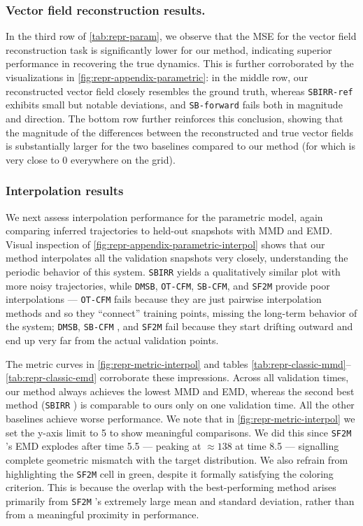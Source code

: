\subsubsection{Vector field reconstruction results.}
\label{app:repr-vector-parametric}

In the third row of \cref{tab:repr-param}, we observe that the MSE for the vector field reconstruction task is significantly lower for our method, indicating superior performance in recovering the true dynamics. This is further corroborated by the visualizations in \cref{fig:repr-appendix-parametric}: in the middle row, our reconstructed vector field closely resembles the ground truth, whereas \texttt{SBIRR-ref} exhibits small but notable deviations, and \texttt{SB-forward} fails both in magnitude and direction. The bottom row further reinforces this conclusion, showing that the magnitude of the differences between the reconstructed and true vector fields is substantially larger for the two baselines compared to our method (for which is very close to 0 everywhere on the grid).

\subsubsection{Interpolation results}
\label{app:repr-interpol-parametric}

We next assess interpolation performance for the parametric model, again comparing inferred trajectories to held-out snapshots with MMD and EMD. Visual inspection of \cref{fig:repr-appendix-parametric-interpol} shows that our method interpolates all the validation snapshots very closely, understanding the periodic behavior of this system. \texttt{SBIRR} yields a qualitatively similar plot with more noisy trajectories, while \texttt{DMSB}, \texttt{OT-CFM}, \texttt{SB-CFM}, and \texttt{SF2M} provide poor interpolations --- \texttt{OT-CFM} fails because they are just pairwise interpolation methods and so they “connect” training points, missing the long-term behavior of the system; \texttt{DMSB}, \texttt{SB-CFM} , and \texttt{SF2M} fail because they start drifting outward and end up very far from the actual validation points.  

The metric curves in \cref{fig:repr-metric-interpol} and tables \cref{tab:repr-classic-mmd}–\cref{tab:repr-classic-emd} corroborate these impressions. Across all validation times, our method always achieves the lowest MMD and EMD, whereas the second best method (\texttt{SBIRR} ) is comparable to ours only on one validation time. All the other baselines achieve worse performance. We note that in  \cref{fig:repr-metric-interpol} we set the y-axis limit to 5 to show meaningful comparisons. We did this since \texttt{SF2M} ’s EMD explodes after time 5.5 --- peaking at $\approx 138$ at time 8.5 --- signalling complete geometric mismatch with the target distribution. We also refrain from highlighting the \texttt{SF2M}  cell in green, despite it formally satisfying the coloring criterion. This is because the overlap with the best-performing method arises primarily from \texttt{SF2M} 's extremely large mean and standard deviation, rather than from a meaningful proximity in performance.


